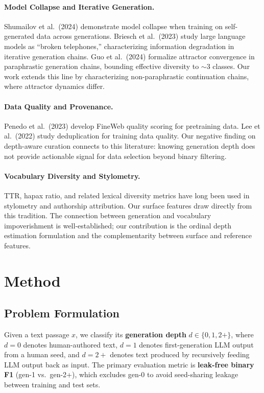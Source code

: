 \documentclass[11pt]{article}
\begin{document}
\paragraph{Model Collapse and Iterative Generation.}
Shumailov et al.\ (2024) demonstrate model collapse when training on self-generated data across generations. Briesch et al.\ (2023) study large language models as ``broken telephones,'' characterizing information degradation in iterative generation chains. Guo et al.\ (2024) formalize attractor convergence in paraphrastic generation chains, bounding effective diversity to $\sim$3 classes. Our work extends this line by characterizing non-paraphrastic continuation chains, where attractor dynamics differ.

\paragraph{Data Quality and Provenance.}
Penedo et al.\ (2023) develop FineWeb quality scoring for pretraining data. Lee et al.\ (2022) study deduplication for training data quality. Our negative finding on depth-aware curation connects to this literature: knowing generation depth does not provide actionable signal for data selection beyond binary filtering.

\paragraph{Vocabulary Diversity and Stylometry.}
TTR, hapax ratio, and related lexical diversity metrics have long been used in stylometry and authorship attribution. Our surface features draw directly from this tradition. The connection between generation and vocabulary impoverishment is well-established; our contribution is the ordinal depth estimation formulation and the complementarity between surface and reference features.

\section{Method}
\label{sec:method}

\subsection{Problem Formulation}

Given a text passage $x$, we classify its \textbf{generation depth} $d \in \{0, 1, 2+\}$, where $d=0$ denotes human-authored text, $d=1$ denotes first-generation LLM output from a human seed, and $d=2+$ denotes text produced by recursively feeding LLM output back as input. The primary evaluation metric is \textbf{leak-free binary F1} (gen-1 vs.\ gen-2+), which excludes gen-0 to avoid seed-sharing leakage between training and test sets.
\end{document}

